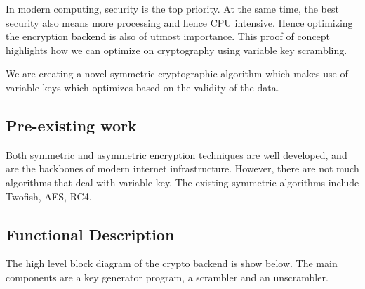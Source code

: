 \label{obj}
\hspace{8mm} In modern computing, security is the top priority. At the same time, the best security also means more processing and hence CPU intensive. Hence optimizing the encryption backend is also of utmost importance. This proof of concept highlights how we can optimize on cryptography using variable key scrambling.






  
  



\hspace{8mm} We are creating a novel symmetric cryptographic algorithm which makes use of variable keys which optimizes based on the validity of the data. 

\subsection{Pre-existing work}

    Both symmetric and asymmetric encryption techniques are well developed, and are the backbones of modern internet infrastructure. However, there are not much algorithms that deal with variable key. The existing symmetric algorithms include Twofish, AES, RC4.

\subsection{Functional Description}
\label{sec:varkey_func_desc}
The high level block diagram of the crypto backend is show below. The main components are a key generator program, a scrambler and an unscrambler.


